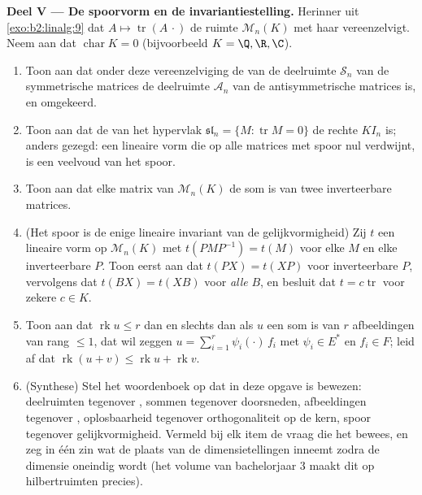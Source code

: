 \begin{problem}
\medskip
\noindent\textbf{Deel V --- De spoorvorm en de
invariantiestelling.} Herinner uit \cref{exo:b2:linalg:9} dat $A
\mapsto \operatorname{tr}(A\,\cdot)$ de ruimte
$\mathcal{M}_n(K)$ met haar  vereenzelvigt. Neem aan dat
$\operatorname{char} K = 0$ (bijvoorbeeld $K = \Q, \R, \C$).
\begin{enumerate}[resume]
  \item Toon aan dat onder deze vereenzelviging de  van
        de deelruimte $\mathcal{S}_n$ van de symmetrische matrices
        de deelruimte $\mathcal{A}_n$ van de antisymmetrische
        matrices is, en omgekeerd.
  \item Toon aan dat de  van het hypervlak
        $\mathfrak{sl}_n = \{M : \operatorname{tr} M = 0\}$ de
        rechte $K I_n$ is; anders gezegd: een lineaire vorm die op
        alle matrices met spoor nul verdwijnt, is een veelvoud van
        het spoor.
  \item Toon aan dat elke matrix van $\mathcal{M}_n(K)$ de som is
        van twee inverteerbare matrices.
  \item (Het spoor is de enige lineaire invariant van de
        gelijkvormigheid) Zij $t$ een lineaire vorm op
        $\mathcal{M}_n(K)$ met $t(PMP^{-1}) = t(M)$ voor elke $M$
        en elke inverteerbare $P$. Toon eerst aan dat $t(PX) =
        t(XP)$ voor inverteerbare $P$, vervolgens dat $t(BX) =
        t(XB)$ voor \emph{alle} $B$, en besluit dat $t = c
        \operatorname{tr}$ voor zekere $c \in K$.
  \item Toon aan dat $\operatorname{rk} u \leq r$ dan en slechts
        dan als $u$ een som is van $r$ afbeeldingen van rang $\leq
        1$, dat wil zeggen $u = \sum_{i=1}^{r} \psi_i(\cdot)\,f_i$
        met $\psi_i \in E^*$ en $f_i \in F$; leid af dat
        $\operatorname{rk}(u + v) \leq \operatorname{rk} u +
        \operatorname{rk} v$.
  \item (Synthese) Stel het woordenboek op dat in deze opgave is
        bewezen: deelruimten tegenover , sommen
        tegenover doorsneden, afbeeldingen tegenover
        , oplosbaarheid tegenover orthogonaliteit
        op de  kern, spoor tegenover
        gelijkvormigheid. Vermeld bij elk item de vraag die het
        bewees, en zeg in één zin wat de plaats van de
        dimensietellingen inneemt zodra de dimensie oneindig wordt
        (het volume van bachelorjaar 3 maakt dit op hilbertruimten
        precies).
\end{enumerate}
\end{problem}

